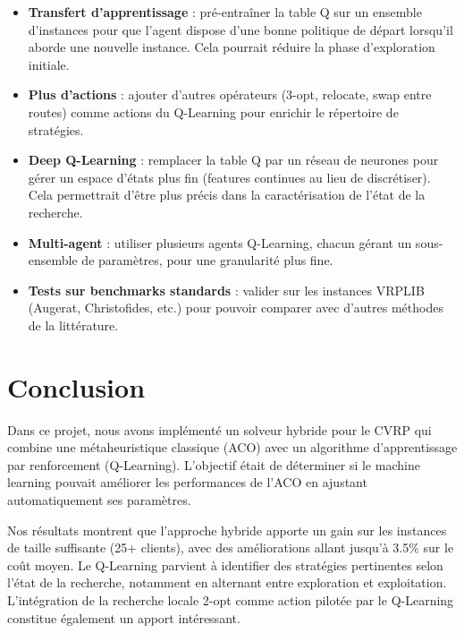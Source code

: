 \documentclass[12pt, a4paper]{article}
\begin{document}
\begin{itemize}
    \item \textbf{Transfert d'apprentissage} : pré-entraîner la table Q sur un ensemble d'instances pour que l'agent dispose d'une bonne politique de départ lorsqu'il aborde une nouvelle instance. Cela pourrait réduire la phase d'exploration initiale.

    \item \textbf{Plus d'actions} : ajouter d'autres opérateurs (3-opt, relocate, swap entre routes) comme actions du Q-Learning pour enrichir le répertoire de stratégies.

    \item \textbf{Deep Q-Learning} : remplacer la table Q par un réseau de neurones pour gérer un espace d'états plus fin (features continues au lieu de discrétiser). Cela permettrait d'être plus précis dans la caractérisation de l'état de la recherche.

    \item \textbf{Multi-agent} : utiliser plusieurs agents Q-Learning, chacun gérant un sous-ensemble de paramètres, pour une granularité plus fine.

    \item \textbf{Tests sur benchmarks standards} : valider sur les instances VRPLIB (Augerat, Christofides, etc.) pour pouvoir comparer avec d'autres méthodes de la littérature.
\end{itemize}

\section{Conclusion}

Dans ce projet, nous avons implémenté un solveur hybride pour le CVRP qui combine une métaheuristique classique (ACO) avec un algorithme d'apprentissage par renforcement (Q-Learning). L'objectif était de déterminer si le machine learning pouvait améliorer les performances de l'ACO en ajustant automatiquement ses paramètres.

Nos résultats montrent que l'approche hybride apporte un gain sur les instances de taille suffisante (25+ clients), avec des améliorations allant jusqu'à 3.5\% sur le coût moyen. Le Q-Learning parvient à identifier des stratégies pertinentes selon l'état de la recherche, notamment en alternant entre exploration et exploitation. L'intégration de la recherche locale 2-opt comme action pilotée par le Q-Learning constitue également un apport intéressant.
\end{document}
